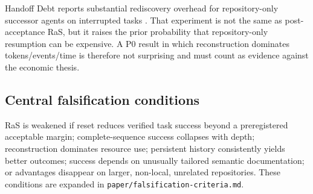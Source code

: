 Handoff Debt reports substantial rediscovery overhead for repository-only successor agents on interrupted tasks \citep{kc2026handoff}. That experiment is not the same as post-acceptance RaS, but it raises the prior probability that repository-only resumption can be expensive. A P0 result in which reconstruction dominates tokens/events/time is therefore not surprising and must count as evidence against the economic thesis.

\subsection{Central falsification conditions}

RaS is weakened if reset reduces verified task success beyond a preregistered acceptable margin; complete-sequence success collapses with depth; reconstruction dominates resource use; persistent history consistently yields better outcomes; success depends on unusually tailored semantic documentation; or advantages disappear on larger, non-local, unrelated repositories. These conditions are expanded in \texttt{paper/falsification-criteria.md}.
